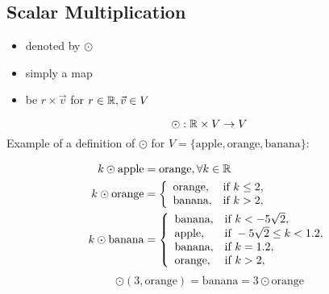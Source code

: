 \subsection*{Scalar Multiplication}
\begin{itemize}
  \item denoted by $\odot$
  \item simply a map
  \item {} be $r \times \vec{v}$ for $r \in \mathbb{R}, \vec{v} \in V$
\end{itemize}
\[
  \odot: \mathbb{R} \times V \rightarrow V
\]
Example of a definition of $\odot$ for $V=\{\text{apple}, \text{orange}, \text{banana}\}$:
\begin{center}
  \begin{align*}
    k \odot \text{apple}  & = \text{orange}, \forall k \in \mathbb{R} \\
    k \odot \text{orange} & = \left\{
    \begin{array}{lr}
      \text{orange}, & \text{if}~k \leq 2, \\
      \text{banana}, & \text{if}~k > 2,    \\
    \end{array} \right.                          \\
    k \odot \text{banana} & = \left\{
    \begin{array}{ll}
      \text{banana}, & \text{if}~k < -5\sqrt{2},          \\
      \text{apple},  & \text{if}~-5\sqrt{2} \leq k < 1.2, \\
      \text{banana}, & \text{if}~k = 1.2,                 \\
      \text{orange}, & \text{if}~k > 2,                   \\
    \end{array}
    \right.
  \end{align*}
  \[
    \odot(3, \text{orange}) = \text{banana} = 3 \odot \text{orange}
  \]
\end{center}


